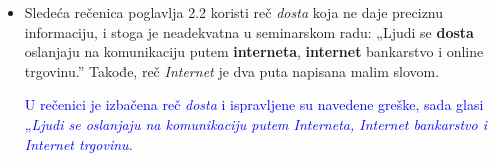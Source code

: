 \documentclass[a4paper]{report}
\newcommand{\odgovor}[1]{\textcolor{blue}{#1}}
\begin{document}
\begin{itemize}
    \item Sledeća rečenica poglavlja 2.2 koristi reč \textit{dosta} koja ne daje preciznu informaciju, i stoga je neadekvatna u seminarskom radu:\newline
    „Ljudi se \textbf{dosta} oslanjaju na komunikaciju putem \textbf{interneta}, \textbf{internet} bankarstvo
i online trgovinu.”\newline
Takođe, reč \textit{Internet} je dva puta napisana malim slovom.

	\odgovor{U rečenici je izbačena reč \textit{dosta} i ispravljene su navedene greške, sada glasi „\textit{Ljudi se oslanjaju na komunikaciju putem Interneta, Internet bankarstvo i Internet trgovinu.}}
	
\end{itemize}
\end{document}
